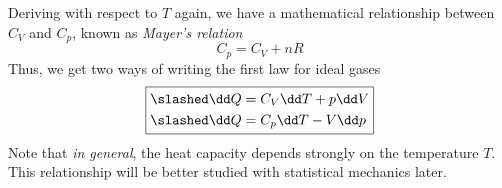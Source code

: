 \documentclass[../qm.tex]{subfiles}
\begin{document}
Deriving with respect to $T$ again, we have a mathematical relationship between $C_V$ and $C_p$, known as \emph{Mayer's relation}
\begin{equation}
	C_p=C_V+nR
	\label{eq:mayers.ig}
\end{equation}
Thus, we get two ways of writing the first law for ideal gases
\begin{equation}
	\boxed{\begin{aligned}
		\slashed\dd Q&= C_V\dd T+p\dd V\\
		\slashed\dd Q&= C_p\dd T-V\dd p
	\end{aligned}}
	\label{eq:1stideal.ig}
\end{equation}
Note that \textit{in general}, the heat capacity depends strongly on the temperature $T$. This relationship will be better studied with statistical mechanics later.
\end{document}
